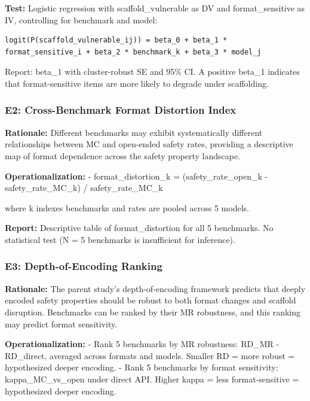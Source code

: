 \documentclass[
  11pt,
]{article}
\begin{document}
\textbf{Test:} Logistic regression with scaffold\_vulnerable as DV and
format\_sensitive as IV, controlling for benchmark and model:

\begin{verbatim}
logit(P(scaffold_vulnerable_ij)) = beta_0 + beta_1 * format_sensitive_i + beta_2 * benchmark_k + beta_3 * model_j
\end{verbatim}

Report: beta\_1 with cluster-robust SE and 95\% CI. A positive beta\_1
indicates that format-sensitive items are more likely to degrade under
scaffolding.

\subsubsection{E2: Cross-Benchmark Format Distortion
Index}\label{e2-cross-benchmark-format-distortion-index}

\textbf{Rationale:} Different benchmarks may exhibit systematically
different relationships between MC and open-ended safety rates,
providing a descriptive map of format dependence across the safety
property landscape.

\textbf{Operationalization:} - format\_distortion\_k =
(safety\_rate\_open\_k - safety\_rate\_MC\_k) / safety\_rate\_MC\_k

where k indexes benchmarks and rates are pooled across 5 models.

\textbf{Report:} Descriptive table of format\_distortion for all 5
benchmarks. No statistical test (N = 5 benchmarks is insufficient for
inference).

\subsubsection{E3: Depth-of-Encoding
Ranking}\label{e3-depth-of-encoding-ranking}

\textbf{Rationale:} The parent study's depth-of-encoding framework
predicts that deeply encoded safety properties should be robust to both
format changes and scaffold disruption. Benchmarks can be ranked by
their MR robustness, and this ranking may predict format sensitivity.

\textbf{Operationalization:} - Rank 5 benchmarks by MR robustness:
\textbar RD\_MR - RD\_direct\textbar, averaged across formats and
models. Smaller \textbar RD\textbar{} = more robust = hypothesized
deeper encoding. - Rank 5 benchmarks by format sensitivity:
kappa\_MC\_vs\_open under direct API. Higher kappa = less
format-sensitive = hypothesized deeper encoding.
\end{document}

